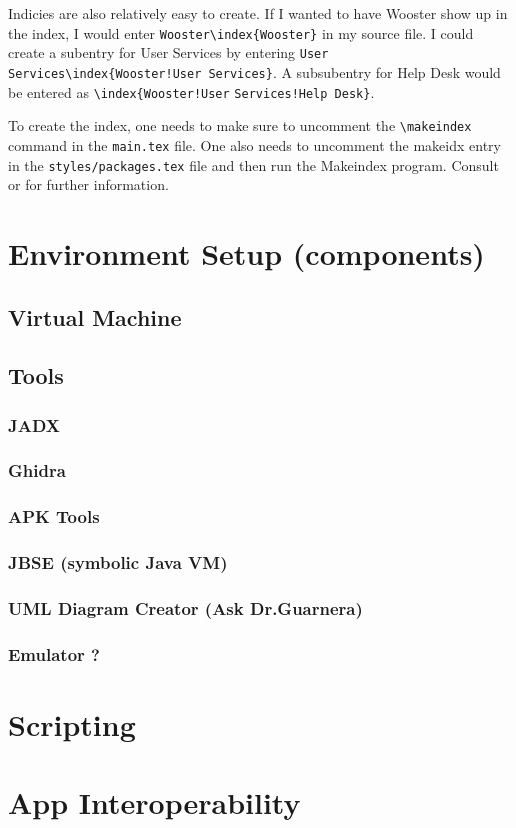 Indicies are also relatively easy to create. If I wanted to have Wooster show up in the index, I would enter \verb|Wooster\index{Wooster}| in my source file. I could create a subentry for User Services by entering \verb|User Services|\verb|\index{Wooster!User Services}|. A subsubentry for Help Desk would be entered as \verb|\index{Wooster!User| \verb|Services!Help Desk}|.

To create the index, one needs to make sure to uncomment the \verb|\makeindex| command in the \texttt{main.tex} file. One also needs to uncomment the makeidx entry in the \verb|styles/packages.tex| file and then run the Makeindex program. Consult \citet{kd03} or \citet{mgbcr04} for further information.



\section{Environment Setup (components)}
\subsection{Virtual Machine}
\subsection{Tools}
\subsubsection{JADX}
\subsubsection{Ghidra}
\subsubsection{APK Tools}
\subsubsection{JBSE (symbolic Java VM)}
\subsubsection{UML Diagram Creator (Ask Dr.Guarnera)}
\subsubsection{Emulator ?}

\section{Scripting}
\section{App Interoperability}


